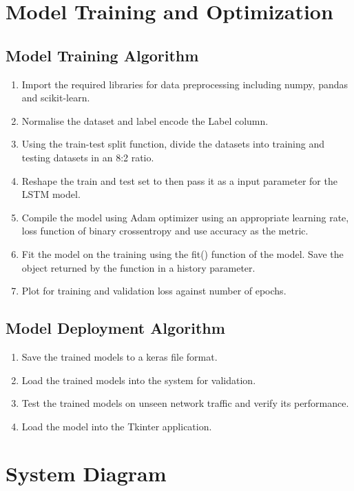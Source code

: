 \section{Model Training and Optimization}
\vspace{-18pt}
\subsection{Model Training Algorithm}
\vspace{-18pt}
\begin{enumerate}[label=\roman*.]
	\item Import the required libraries for data preprocessing including numpy, pandas and scikit-learn.
	\item Normalise the dataset and label encode the Label column.
	\item Using the train-test split function, divide the datasets into training and testing datasets in an 8:2 ratio.
	\item Reshape the train and test set to then pass it as a input parameter for the LSTM model.
	\item Compile the model using Adam optimizer using an appropriate learning rate, loss function of binary crossentropy and use accuracy as the metric.
	\item Fit the model on the training using the fit() function of the model. Save the object returned by the function in a history parameter.
	\item  Plot for training and validation loss against number of epochs.
\end{enumerate}
\subsection{Model Deployment Algorithm}
\vspace{-18pt}
\begin{enumerate}[label=\roman*.]
	\item Save the trained models to a keras file format. 
	\item Load the trained models into the system for validation.
	\item Test the trained models on unseen network traffic and verify its performance.
	\item Load the model into the Tkinter application.
\end{enumerate}
\section{System Diagram}
\vspace{-18pt}
